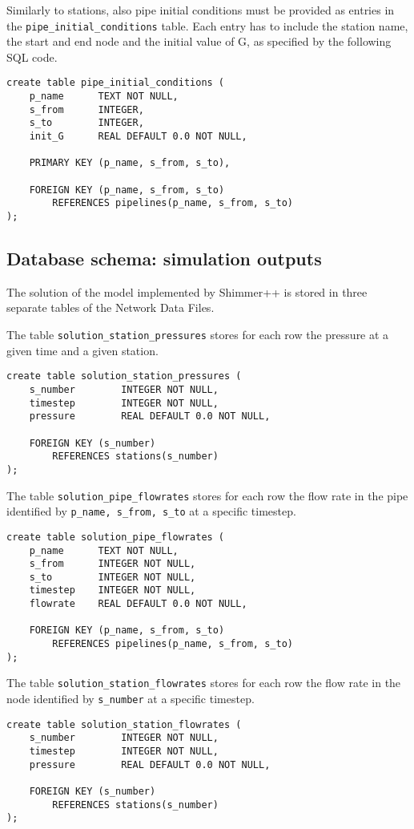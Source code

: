 Similarly to stations, also pipe initial conditions must be provided as entries
in the \texttt{pipe\_initial\_conditions} table. Each entry has to include the
station name, the start and end node and the initial value of G, as specified
by the following SQL code.
\begin{verbatim}
create table pipe_initial_conditions (
    p_name      TEXT NOT NULL,
    s_from      INTEGER,
    s_to        INTEGER,
    init_G      REAL DEFAULT 0.0 NOT NULL,
    
    PRIMARY KEY (p_name, s_from, s_to),

    FOREIGN KEY (p_name, s_from, s_to)
        REFERENCES pipelines(p_name, s_from, s_to)
);
\end{verbatim}
\subsection{Database schema: simulation outputs}

The solution of the model implemented by Shimmer++ is stored in three separate
tables of the Network Data Files.

The table \texttt{solution\_station\_pressures} stores for each row the pressure
at a given time and a given station.
\begin{verbatim}
create table solution_station_pressures (
    s_number        INTEGER NOT NULL,
    timestep        INTEGER NOT NULL,
    pressure        REAL DEFAULT 0.0 NOT NULL,
    
    FOREIGN KEY (s_number)
        REFERENCES stations(s_number)
);
\end{verbatim}

The table \texttt{solution\_pipe\_flowrates} stores for each row the flow rate
in the pipe identified by \texttt{p\_name, s\_from, s\_to} at a specific timestep.
\begin{verbatim}
create table solution_pipe_flowrates (
    p_name      TEXT NOT NULL,
    s_from      INTEGER NOT NULL,
    s_to        INTEGER NOT NULL,
    timestep    INTEGER NOT NULL,
    flowrate    REAL DEFAULT 0.0 NOT NULL,

    FOREIGN KEY (p_name, s_from, s_to)
        REFERENCES pipelines(p_name, s_from, s_to)
);
\end{verbatim}

The table \texttt{solution\_station\_flowrates} stores for each row the flow rate
in the node identified by \texttt{s\_number} at a specific timestep.
\begin{verbatim}
create table solution_station_flowrates (
    s_number        INTEGER NOT NULL,
    timestep        INTEGER NOT NULL,
    pressure        REAL DEFAULT 0.0 NOT NULL,
    
    FOREIGN KEY (s_number)
        REFERENCES stations(s_number)
);
\end{verbatim}

